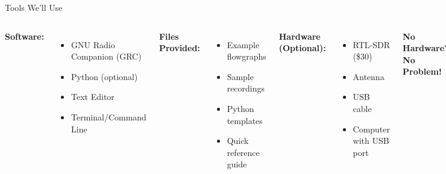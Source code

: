 \documentclass[aspectratio=169,11pt]{beamer}
\begin{document}
\begin{frame}{Tools We'll Use}
\begin{columns}
\textbf{\Large Software:}
\begin{itemize}
    \item GNU Radio Companion (GRC)
    \item Python (optional)
    \item Text Editor
    \item Terminal/Command Line
\end{itemize}
\vspace{1em}
\textbf{\Large Files Provided:}
\begin{itemize}
    \item Example flowgraphs
    \item Sample recordings
    \item Python templates
    \item Quick reference guide
\end{itemize}

\textbf{\Large Hardware (Optional):}
\begin{itemize}
    \item RTL-SDR (\$30)
    \item Antenna
    \item USB cable
    \item Computer with USB port
\end{itemize}
\vspace{1em}
\textbf{\Large No Hardware? No Problem!}
\begin{itemize}
    \item Use provided recordings
    \item Simulate everything
    \item Borrow from neighbor
    \item Watch demos
\end{itemize}
\end{columns}
\end{frame}
\end{document}
